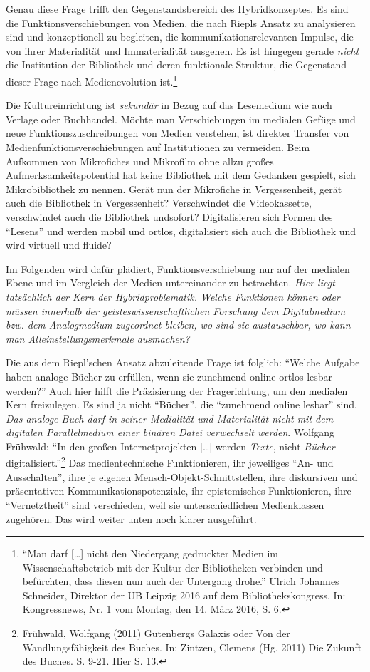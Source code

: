 \documentclass[a4paper,
fontsize=11pt,
oneside,
numbers=noperiodatend,
parskip=half-,
bibliography=totoc,
final
]{scrartcl}
\begin{document}
Genau diese Frage trifft den Gegenstandsbereich des Hybridkonzeptes. Es
sind die Funktionsverschiebungen von Medien, die nach Riepls Ansatz zu
analysieren sind und konzeptionell zu begleiten, die
kommunikationsrelevanten Impulse, die von ihrer Materialität und
Immaterialität ausgehen. Es ist hingegen gerade \emph{nicht} die
Institution der Bibliothek und deren funktionale Struktur, die
Gegenstand dieser Frage nach Medienevolution ist.\footnote{\enquote{Man
  darf {[}\ldots{}{]} nicht den Niedergang gedruckter Medien im
  Wissenschaftsbetrieb mit der Kultur der Bibliotheken verbinden und
  befürchten, dass diesen nun auch der Untergang drohe.} Ulrich Johannes
  Schneider, Direktor der UB Leipzig 2016 auf dem Bibliothekskongress.
  In: Kongressnews, Nr. 1 vom Montag, den 14. März 2016, S. 6.}

Die Kultureinrichtung ist \emph{sekundär} in Bezug auf das Lesemedium
wie auch Verlage oder Buchhandel. Möchte man Verschiebungen im medialen
Gefüge und neue Funktionszuschreibungen von Medien verstehen, ist
direkter Transfer von Medienfunktionsverschiebungen auf Institutionen zu
vermeiden. Beim Aufkommen von Mikrofiches und Mikrofilm ohne allzu
großes Aufmerksamkeitspotential hat keine Bibliothek mit dem Gedanken
gespielt, sich Mikrobibliothek zu nennen. Gerät nun der Mikrofiche in
Vergessenheit, gerät auch die Bibliothek in Vergessenheit? Verschwindet
die Videokassette, verschwindet auch die Bibliothek undsofort?
Digitalisieren sich Formen des \enquote{Lesens} und werden mobil und
ortlos, digitalisiert sich auch die Bibliothek und wird virtuell und
fluide?

Im Folgenden wird dafür plädiert, Funktionsverschiebung nur auf der
medialen Ebene und im Vergleich der Medien untereinander zu betrachten.
\emph{Hier liegt tatsächlich der Kern der Hybridproblematik. Welche
Funktionen können oder müssen innerhalb der geisteswissenschaftlichen
Forschung dem Digitalmedium bzw. dem Analogmedium zugeordnet bleiben, wo
sind sie austauschbar, wo kann man Alleinstellungsmerkmale ausmachen?}

Die aus dem Riepl'schen Ansatz abzuleitende Frage ist folglich:
\enquote{Welche Aufgabe haben analoge Bücher zu erfüllen, wenn sie
zunehmend online ortlos lesbar werden?} Auch hier hilft die Präzisierung
der Fragerichtung, um den medialen Kern freizulegen. Es sind ja nicht
\enquote{Bücher}, die \enquote{zunehmend online lesbar} sind. \emph{Das
analoge Buch darf in seiner Medialität und Materialität nicht mit dem
digitalen Parallelmedium einer binären Datei verwechselt werden}.
Wolfgang Frühwald: \enquote{In den großen Internetprojekten
{[}\ldots{}{]} werden \emph{Texte}, nicht \emph{Bücher}
digitalisiert.}\footnote{Frühwald, Wolfgang (2011) Gutenbergs Galaxis
  oder Von der Wandlungsfähigkeit des Buches. In: Zintzen, Clemens (Hg.
  2011) Die Zukunft des Buches. S. 9-21. Hier S. 13.} Das
medientechnische Funktionieren, ihr jeweiliges \enquote{An- und
Ausschalten}, ihre je eigenen Mensch-Objekt-Schnittstellen, ihre
diskursiven und präsentativen Kommunikationspotenziale, ihr
epistemisches Funktionieren, ihre \enquote{Vernetztheit} sind
verschieden, weil sie unterschiedlichen Medienklassen zugehören. Das
wird weiter unten noch klarer ausgeführt.
\end{document}
